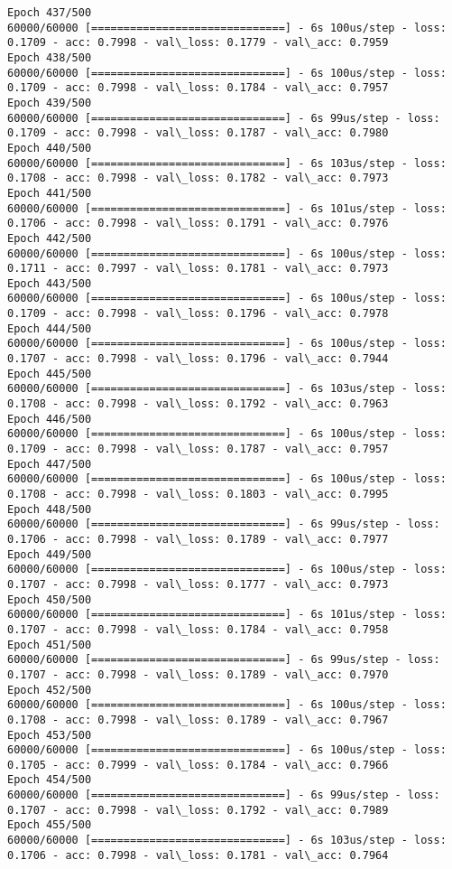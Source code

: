\documentclass[11pt]{article}
\begin{document}
\begin{Verbatim}[commandchars=\\\{\}]
Epoch 437/500
60000/60000 [==============================] - 6s 100us/step - loss: 0.1709 - acc: 0.7998 - val\_loss: 0.1779 - val\_acc: 0.7959
Epoch 438/500
60000/60000 [==============================] - 6s 100us/step - loss: 0.1709 - acc: 0.7998 - val\_loss: 0.1784 - val\_acc: 0.7957
Epoch 439/500
60000/60000 [==============================] - 6s 99us/step - loss: 0.1709 - acc: 0.7998 - val\_loss: 0.1787 - val\_acc: 0.7980
Epoch 440/500
60000/60000 [==============================] - 6s 103us/step - loss: 0.1708 - acc: 0.7998 - val\_loss: 0.1782 - val\_acc: 0.7973
Epoch 441/500
60000/60000 [==============================] - 6s 101us/step - loss: 0.1706 - acc: 0.7998 - val\_loss: 0.1791 - val\_acc: 0.7976
Epoch 442/500
60000/60000 [==============================] - 6s 100us/step - loss: 0.1711 - acc: 0.7997 - val\_loss: 0.1781 - val\_acc: 0.7973
Epoch 443/500
60000/60000 [==============================] - 6s 100us/step - loss: 0.1709 - acc: 0.7998 - val\_loss: 0.1796 - val\_acc: 0.7978
Epoch 444/500
60000/60000 [==============================] - 6s 100us/step - loss: 0.1707 - acc: 0.7998 - val\_loss: 0.1796 - val\_acc: 0.7944
Epoch 445/500
60000/60000 [==============================] - 6s 103us/step - loss: 0.1708 - acc: 0.7998 - val\_loss: 0.1792 - val\_acc: 0.7963
Epoch 446/500
60000/60000 [==============================] - 6s 100us/step - loss: 0.1709 - acc: 0.7998 - val\_loss: 0.1787 - val\_acc: 0.7957
Epoch 447/500
60000/60000 [==============================] - 6s 100us/step - loss: 0.1708 - acc: 0.7998 - val\_loss: 0.1803 - val\_acc: 0.7995
Epoch 448/500
60000/60000 [==============================] - 6s 99us/step - loss: 0.1706 - acc: 0.7998 - val\_loss: 0.1789 - val\_acc: 0.7977
Epoch 449/500
60000/60000 [==============================] - 6s 100us/step - loss: 0.1707 - acc: 0.7998 - val\_loss: 0.1777 - val\_acc: 0.7973
Epoch 450/500
60000/60000 [==============================] - 6s 101us/step - loss: 0.1707 - acc: 0.7998 - val\_loss: 0.1784 - val\_acc: 0.7958
Epoch 451/500
60000/60000 [==============================] - 6s 99us/step - loss: 0.1707 - acc: 0.7998 - val\_loss: 0.1789 - val\_acc: 0.7970
Epoch 452/500
60000/60000 [==============================] - 6s 100us/step - loss: 0.1708 - acc: 0.7998 - val\_loss: 0.1789 - val\_acc: 0.7967
Epoch 453/500
60000/60000 [==============================] - 6s 100us/step - loss: 0.1705 - acc: 0.7999 - val\_loss: 0.1784 - val\_acc: 0.7966
Epoch 454/500
60000/60000 [==============================] - 6s 99us/step - loss: 0.1707 - acc: 0.7998 - val\_loss: 0.1792 - val\_acc: 0.7989
Epoch 455/500
60000/60000 [==============================] - 6s 103us/step - loss: 0.1706 - acc: 0.7998 - val\_loss: 0.1781 - val\_acc: 0.7964

\end{Verbatim}
\end{document}
